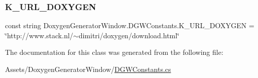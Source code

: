 \subsubsection{\texorpdfstring{K\+\_\+\+U\+R\+L\+\_\+\+D\+O\+X\+Y\+G\+EN}{K\_URL\_DOXYGEN}}
{\footnotesize\ttfamily const string Doxygen\+Generator\+Window.\+D\+G\+W\+Constants.\+K\+\_\+\+U\+R\+L\+\_\+\+D\+O\+X\+Y\+G\+EN = \char`\"{}http\+://www.\+stack.\+nl/$\sim$dimitri/doxygen/download.\+html\char`\"{}}



The documentation for this class was generated from the following file\+:\begin{DoxyCompactItemize}
\item 
Assets/\+Doxygen\+Generator\+Window/\hyperlink{_d_g_w_constants_8cs}{D\+G\+W\+Constants.\+cs}\end{DoxyCompactItemize}
